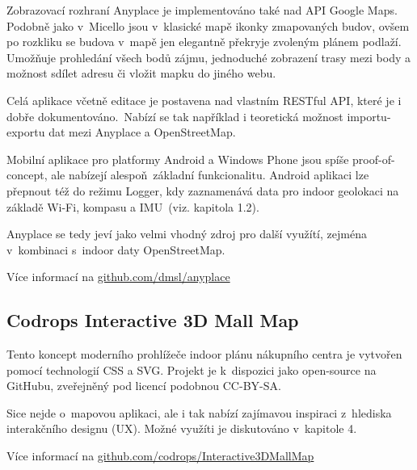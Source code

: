 Zobrazovací rozhraní Anyplace je implementováno také nad API Google Maps. Podobně jako v~Micello jsou v~klasické mapě ikonky zmapovaných budov, ovšem po rozkliku se budova v~mapě jen elegantně překryje zvoleným plánem podlaží. Umožňuje prohledání všech bodů zájmu, jednoduché zobrazení trasy mezi body a možnost sdílet adresu či vložit mapku do jiného webu.

Celá aplikace včetně editace je postavena nad vlastním RESTful API, které je i dobře dokumentováno.\cite{zdroj26}~Nabízí se tak například i teoretická možnost importu-exportu dat mezi Anyplace a OpenStreetMap.

Mobilní aplikace pro platformy Android a Windows Phone jsou spíše proof-of-concept, ale nabízejí alespoň~základní funkcionalitu. Android aplikaci lze přepnout též do režimu Logger, kdy zaznamenává data pro indoor geolokaci na základě Wi-Fi, kompasu a IMU~(viz. kapitola 1.2).

Anyplace se tedy jeví jako velmi vhodný zdroj pro další využítí, zejména v~kombinaci s~indoor daty OpenStreetMap.

Více informací na \href{http://github.com/dmsl/anyplace}{github.com/dmsl/anyplace}~

\subsection{Codrops Interactive 3D Mall Map}\label{codrops-interactive-3d-mall-map}

Tento koncept moderního prohlížeče indoor plánu nákupního centra je vytvořen pomocí technologií CSS a SVG. Projekt je k~dispozici jako open-source na GitHubu, zveřejněný pod licencí podobnou CC-BY-SA.

Sice nejde o~mapovou aplikaci, ale i tak nabízí zajímavou inspiraci z~hlediska interakčního designu (UX). Možné využíti je diskutováno v~kapitole 4.

Více informací na \href{http://github.com/codrops/Interactive3DMallMap}{github.com/codrops/Interactive3DMallMap}


